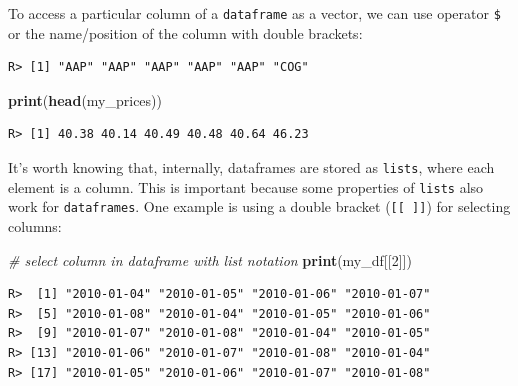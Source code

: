 \documentclass[
  12pt,
]{book}
\newenvironment{Shaded}{\begin{snugshade}}{\end{snugshade}}
\newcommand{\CommentTok}[1]{\textcolor[rgb]{0.37,0.37,0.37}{\textit{#1}}}
\newcommand{\DecValTok}[1]{\textcolor[rgb]{0.06,0.06,0.06}{#1}}
\newcommand{\KeywordTok}[1]{\textcolor[rgb]{0.27,0.27,0.27}{\textbf{#1}}}
\newcommand{\NormalTok}[1]{#1}
\newcommand{\OperatorTok}[1]{\textcolor[rgb]{0.43,0.43,0.43}{\textbf{#1}}}
\newcommand{\StringTok}[1]{\textcolor[rgb]{0.5,0.5,0.5}{#1}}
\begin{document}
To access a particular column of a \texttt{dataframe} as a vector, we can use operator \texttt{\$} or the name/position of the column with double brackets:

\begin{Shaded}
\end{Shaded}

\begin{verbatim}
R> [1] "AAP" "AAP" "AAP" "AAP" "AAP" "COG"
\end{verbatim}

\begin{Shaded}
\begin{Highlighting}[]
\KeywordTok{print}\NormalTok{(}\KeywordTok{head}\NormalTok{(my_prices))}
\end{Highlighting}
\end{Shaded}

\begin{verbatim}
R> [1] 40.38 40.14 40.49 40.48 40.64 46.23
\end{verbatim}

It's worth knowing that, internally, dataframes are stored as \texttt{lists}, where each element is a column. This is important because some properties of \texttt{lists} also work for \texttt{dataframes}. One example is using a double bracket (\texttt{{[}{[}\ {]}{]}}) for selecting columns:

\begin{Shaded}
\begin{Highlighting}[]
\CommentTok{# select column in dataframe with list notation}
\KeywordTok{print}\NormalTok{(my_df[[}\DecValTok{2}\NormalTok{]])}
\end{Highlighting}
\end{Shaded}

\begin{verbatim}
R>  [1] "2010-01-04" "2010-01-05" "2010-01-06" "2010-01-07"
R>  [5] "2010-01-08" "2010-01-04" "2010-01-05" "2010-01-06"
R>  [9] "2010-01-07" "2010-01-08" "2010-01-04" "2010-01-05"
R> [13] "2010-01-06" "2010-01-07" "2010-01-08" "2010-01-04"
R> [17] "2010-01-05" "2010-01-06" "2010-01-07" "2010-01-08"
\end{verbatim}
\end{document}
